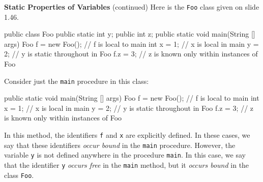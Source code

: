 \begin{minipage}[t]{\sw}
\slidenumber
\LARGE
{\bf Static Properties of Variables} (continued)\exx
\Large
Here is the \verb'Foo' class given on slide 1.46.
\large
\begin{qv}
public class Foo {
   public static int y;
   public int z;
   public static void main(String [] args) {
     Foo f = new Foo(); // f is local to main
     int x = 1; // x is local in main
     y = 2; // y is static throughout in Foo
     f.z = 3; // z is known only within instances of Foo
   }
}
\end{qv}
\Large
Consider just the \verb'main' procedure in this class:
\large
\begin{qv}
   public static void main(String [] args) {
     Foo f = new Foo(); // f is local to main
     int x = 1; // x is local in main
     y = 2; // y is static throughout in Foo
     f.z = 3; // z is known only within instances of Foo
   }
\end{qv}
\Large
In this method, the identifiers
\verb'f' and \verb'x' are explicitly defined.
In these cases, we say that these identifiers {\em occur bound}
in the \verb'main' procedure.\exx
However, the variable \verb'y' is not defined anywhere
in the procedure \verb'main'.
In this case, we say that the identifier \verb'y' {\em occurs free}
in the \verb'main' method, but it {\em occurs bound} in the class \verb'Foo'.
\end{minipage}
\clearpage
